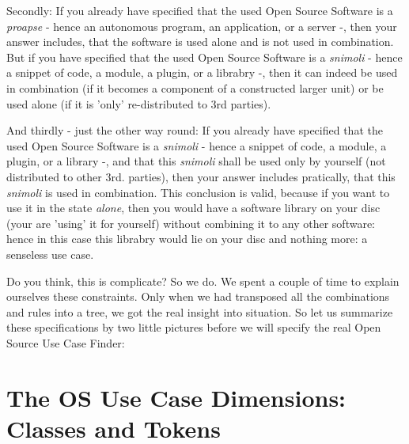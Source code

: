 Secondly: If you already have specified that the used Open Source
Software is a \textit{proapse} - hence an autonomous program, an application,
or a server -, then your answer includes, that the software is used alone and is
not used in combination. But if you have specified that the used Open Source
Software is a \textit{snimoli} - hence a snippet of code, a module, a plugin, or a
librabry -, then it can indeed be used in combination (if it becomes a
component of a constructed larger unit) or be used alone (if it is
'only' re-distributed to 3rd parties).

And thirdly - just the other way round: If you already have specified that the
used Open Source Software is a \textit{snimoli} - hence a snippet of code, a
module, a plugin, or a library -, and that this \textit{snimoli} shall be used
only by yourself (not distributed to other 3rd. parties), then your answer
includes pratically, that this \textit{snimoli} is used in combination. This
conclusion is valid, because if you want to use it in the state \textit{alone},
then you would have a software library on your disc (your are 'using' it for
yourself) without combining it to any other software: hence in this case this
librabry would lie on your disc and nothing more: a senseless use case.

Do you think, this is complicate? So we do. We spent a couple of time to
explain ourselves these constraints. Only when we had transposed all the
combinations and rules into a tree, we got the real insight into situation.
So let us summarize these specifications by two little pictures before we
will specify the real Open Source Use Case Finder:

\section{The OS Use Case Dimensions: Classes and Tokens}

  
